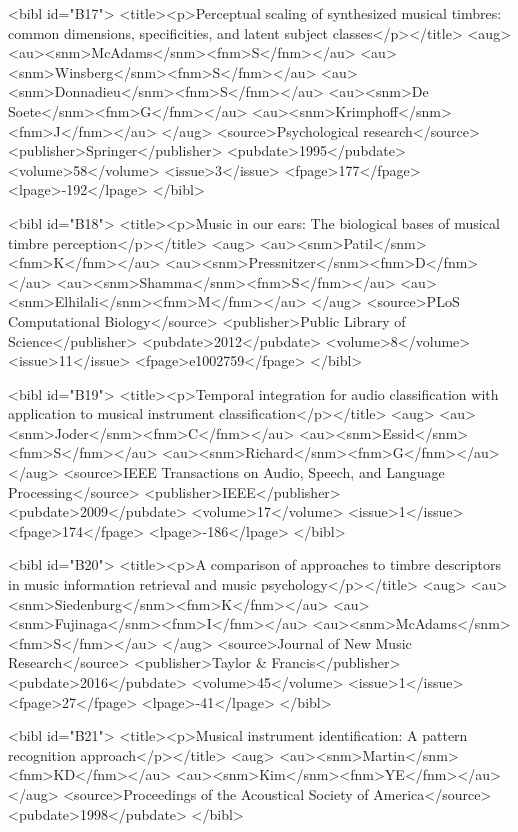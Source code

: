 \documentclass{bmcart}
\begin{document}
\begin{backmatter}
{<bibl id="B17">
  <title><p>Perceptual scaling of synthesized musical timbres: common
  dimensions, specificities, and latent subject classes</p></title>
  <aug>
    <au><snm>McAdams</snm><fnm>S</fnm></au>
    <au><snm>Winsberg</snm><fnm>S</fnm></au>
    <au><snm>Donnadieu</snm><fnm>S</fnm></au>
    <au><snm>De Soete</snm><fnm>G</fnm></au>
    <au><snm>Krimphoff</snm><fnm>J</fnm></au>
  </aug>
  <source>Psychological research</source>
  <publisher>Springer</publisher>
  <pubdate>1995</pubdate>
  <volume>58</volume>
  <issue>3</issue>
  <fpage>177</fpage>
  <lpage>-192</lpage>
</bibl>

<bibl id="B18">
  <title><p>Music in our ears: {The} biological bases of musical timbre
  perception</p></title>
  <aug>
    <au><snm>Patil</snm><fnm>K</fnm></au>
    <au><snm>Pressnitzer</snm><fnm>D</fnm></au>
    <au><snm>Shamma</snm><fnm>S</fnm></au>
    <au><snm>Elhilali</snm><fnm>M</fnm></au>
  </aug>
  <source>PLoS Computational Biology</source>
  <publisher>Public Library of Science</publisher>
  <pubdate>2012</pubdate>
  <volume>8</volume>
  <issue>11</issue>
  <fpage>e1002759</fpage>
</bibl>

<bibl id="B19">
  <title><p>Temporal integration for audio classification with application to
  musical instrument classification</p></title>
  <aug>
    <au><snm>Joder</snm><fnm>C</fnm></au>
    <au><snm>Essid</snm><fnm>S</fnm></au>
    <au><snm>Richard</snm><fnm>G</fnm></au>
  </aug>
  <source>IEEE Transactions on Audio, Speech, and Language Processing</source>
  <publisher>IEEE</publisher>
  <pubdate>2009</pubdate>
  <volume>17</volume>
  <issue>1</issue>
  <fpage>174</fpage>
  <lpage>-186</lpage>
</bibl>

<bibl id="B20">
  <title><p>A comparison of approaches to timbre descriptors in music
  information retrieval and music psychology</p></title>
  <aug>
    <au><snm>Siedenburg</snm><fnm>K</fnm></au>
    <au><snm>Fujinaga</snm><fnm>I</fnm></au>
    <au><snm>McAdams</snm><fnm>S</fnm></au>
  </aug>
  <source>Journal of New Music Research</source>
  <publisher>Taylor \& Francis</publisher>
  <pubdate>2016</pubdate>
  <volume>45</volume>
  <issue>1</issue>
  <fpage>27</fpage>
  <lpage>-41</lpage>
</bibl>

<bibl id="B21">
  <title><p>Musical instrument identification: A pattern recognition
  approach</p></title>
  <aug>
    <au><snm>Martin</snm><fnm>KD</fnm></au>
    <au><snm>Kim</snm><fnm>YE</fnm></au>
  </aug>
  <source>Proceedings of the Acoustical Society of America</source>
  <pubdate>1998</pubdate>
</bibl>

}
\end{backmatter}
\end{document}
